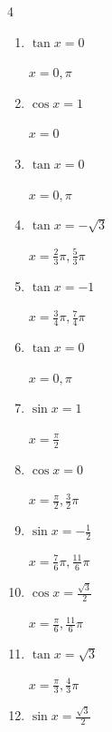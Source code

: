 \begin{multicols}{4}
\begin{enumerate}
        $\displaystyle x = \frac{3}{4}\pi , \frac{5}{4}\pi$

  \item $\displaystyle \tan{x}  = 0$

        $\displaystyle x = 0 , \pi$

  \item $\displaystyle \cos{x}  = 1$

        $\displaystyle x = 0$

  \item $\displaystyle \tan{x}  = 0$

        $\displaystyle x = 0 , \pi$

  \item $\displaystyle \tan{x}  = -\sqrt{3}$

        $\displaystyle x = \frac{2}{3}\pi , \frac{5}{3}\pi$

  \item $\displaystyle \tan{x}  = -1$

        $\displaystyle x = \frac{3}{4}\pi , \frac{7}{4}\pi$

  \item $\displaystyle \tan{x}  = 0$

        $\displaystyle x = 0 , \pi$

\columnbreak %

  \item $\displaystyle \sin{x}  = 1$

        $\displaystyle x = \frac{\pi}{2}$

  \item $\displaystyle \cos{x}  = 0$

        $\displaystyle x = \frac{\pi}{2} , \frac{3}{2}\pi$

  \item $\displaystyle \sin{x}  = -\frac{1}{2}$

        $\displaystyle x = \frac{7}{6}\pi , \frac{11}{6}\pi$

  \item $\displaystyle \cos{x}  = \frac{\sqrt{3}}{2}$

        $\displaystyle x = \frac{\pi}{6} , \frac{11}{6}\pi$

  \item $\displaystyle \tan{x}  = \sqrt{3}$

        $\displaystyle x = \frac{\pi}{3} , \frac{4}{3}\pi$

  \item $\displaystyle \sin{x}  = \frac{\sqrt{3}}{2}$


\end{enumerate}
\end{multicols}
